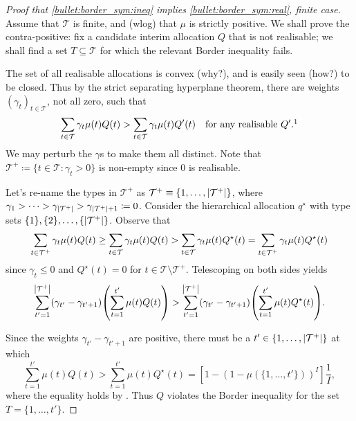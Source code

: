 \begin{proof}[Proof that \ref{bullet:border_sym:ineq} implies \ref{bullet:border_sym:real}, finite case]
	Assume that $\mathcal{T}$ is finite, and (wlog) that $\mu$ is strictly positive.
	We shall prove the contra-positive:
	fix a candidate interim allocation $Q$ that is not realisable;
	we shall find a set $T \subseteq \mathcal{T}$
	for which the relevant Border inequality fails.

	The set of all realisable allocations is convex (why?),
	and is easily seen (how?) to be closed.
	Thus by the strict separating hyperplane theorem,
	there are weights $(\gamma_t)_{t \in \mathcal{T}}$, not all zero, such that
	\begin{equation*}
		\sum_{t \in \mathcal{T}} \gamma_t \mu(t) Q(t)
		> \sum_{t \in \mathcal{T}} \gamma_t \mu(t) Q'(t)
		\quad \text{for any realisable $Q'$.}\footnotemark
	\end{equation*}%
	We may perturb the $\gamma$s to make them all distinct.
	Note that $\mathcal{T}^+ \coloneqq \{ t \in \mathcal{T} : \gamma_t > 0 \}$ is non-empty since $0$ is realisable.


	Let's re-name the types in $\mathcal{T}^+$ as $\mathcal{T}^+ \equiv \{1,\dots,\abs*{\mathcal{T}^+}\}$, where
	$\gamma_1 > \cdots > \gamma_{\abs*{\mathcal{T}^+}} > \gamma_{\abs*{\mathcal{T}^+}+1} \coloneqq 0$.
	Consider the hierarchical allocation $q^\star$
	with type sets $\{1\},\{2\}, \dots, \{\abs*{\mathcal{T}^+}\}$.
	Observe that
	\begin{equation*}
		\sum_{t \in \mathcal{T}^+} \gamma_t \mu(t) Q(t)
		\geq \sum_{t \in \mathcal{T}} \gamma_t \mu(t) Q(t)
		> \sum_{t \in \mathcal{T}} \gamma_t \mu(t) Q^\star(t)
		\\
		= \sum_{t \in \mathcal{T}^+} \gamma_t \mu(t) Q^\star(t) 
	\end{equation*}
	since $\gamma_t \leq 0$ and $Q^\star(t)=0$ for $t \in \mathcal{T} \setminus \mathcal{T}^+$.
	Telescoping on both sides yields
	\begin{equation*}
		\sum_{t'=1}^{\abs*{\mathcal{T}^+}}
		(\gamma_{t'}-\gamma_{t'+1})
		\left( \sum_{t=1}^{t'} \mu(t) Q(t) \right)
		> \sum_{t'=1}^{\abs*{\mathcal{T}^+}}
		(\gamma_{t'}-\gamma_{t'+1})
		\left( \sum_{t=1}^{t'} \mu(t) Q^\star(t) \right) .
	\end{equation*}
	
	Since the weights $\gamma_{t'}-\gamma_{t'+1}$ are positive,
	there must be a $t' \in \{1,\dots,\abs*{\mathcal{T}^+}\}$ at which
	\begin{equation*}
		\sum_{t=1}^{t'} \mu(t) Q(t)
		> \sum_{t=1}^{t'} \mu(t) Q^\star(t) 
		= \left[ 1 - \left( 1 - \mu(\{1,\dots,t'\}) \right)^I \right]
		\frac{1}{I} ,
	\end{equation*}
	where the equality holds by .
	Thus $Q$ violates the Border inequality for the set $T = \{1,\dots,t'\}$.
\end{proof}

